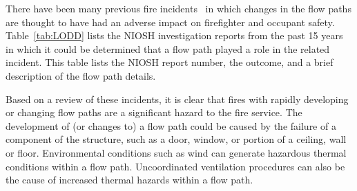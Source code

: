 \documentclass[12pt,oneside]{book}
\begin{document}
There have been many previous fire incidents~\cite{NIOSH:Pettit,NIOSH:Washenitz,NIOSH:Mezzanotte,NIOSH:McFall,NIOSH:McFall2,NIOSH:McFall3,NIOSH:Berardinelli,NIOSH:Koedam,NIOSH:McFall4,NIOSH:Tarley,NIOSH:Braddee,NIOSH:Merinar,NIOSH:Bowyer2,NIOSH:Loflin,NIOSH:Bowyer} in which changes in the flow paths are thought to have had an adverse impact on firefighter and occupant safety. Table~\ref{tab:LODD} lists the NIOSH investigation reports from the past 15 years in which it could be determined that a flow path played a role in the related incident. This table lists the NIOSH report number, the outcome, and a brief description of the flow path details.

Based on a review of these incidents, it is clear that fires with rapidly developing or changing flow paths are a significant hazard to the fire service. The development of (or changes to) a flow path could be caused by the failure of a component of the structure, such as a door, window, or portion of a ceiling, wall or floor. Environmental conditions such as wind can generate hazardous thermal conditions within a flow path. Uncoordinated ventilation procedures can also be the cause of increased thermal hazards within a flow path.
\end{document}
